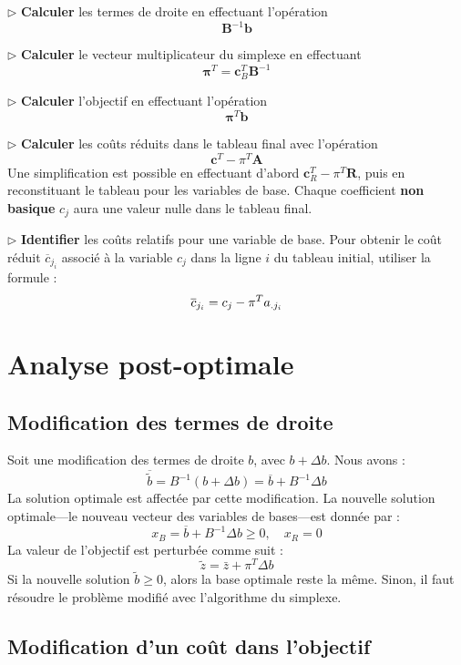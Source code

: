 \documentclass{report}
\begin{document}
\begin{multicols*}{2}
\noindent
$\rhd$
\textbf{Calculer} les termes de droite en effectuant l'opération
\[
\mathbf{B}^{-1} \mathbf{b}
\]

\noindent
$\rhd$
\textbf{Calculer} le vecteur multiplicateur du simplexe en effectuant
\[
\mathbf{\pi}^T = \mathbf{c}_B^T \mathbf{B}^{-1}
\]

\noindent
$\rhd$
\textbf{Calculer} l'objectif en effectuant l'opération 
\[
\mathbf{\pi}^T \mathbf{b}
\]

\noindent
$\rhd$
\textbf{Calculer} les coûts réduits dans le tableau final avec l'opération
\[
\mathbf{c}^T - \pi^T \mathbf{A}
\]
Une simplification est possible en effectuant d'abord 
\( \mathbf{c}_R^T - \pi^T \mathbf{R} \), puis en reconstituant le tableau 
pour les variables de base. Chaque coefficient \textbf{non basique} \( c_j \) aura une valeur nulle dans le tableau final.

\noindent
$\rhd$
\textbf{Identifier} les coûts relatifs pour une variable de base. 
Pour obtenir le coût réduit \( \overline{c}_{j_i} \) associé à la variable 
\( c_j \) dans la ligne \( i \) du tableau initial, utiliser la formule :
\[
\overline{c}_{j_i} = c_j - \pi^T a_{.j_i}
\pagebreak
\] 

\chapter{Analyse post-optimale}




\section{Modification des termes de droite}

Soit une modification des termes de droite \( b \), avec \( b + \Delta b \).
Nous avons :
\[
    \boxed{\overline{\tilde{b}} = B^{-1} (b + \Delta b) = \overline{b} + B^{-1} \Delta b}
\]
La solution optimale est affectée par cette modification. La nouvelle solution
optimale---le nouveau vecteur des variables de bases---est donnée par :
\[
x_B = \overline{b} + B^{-1} \Delta b \geq 0, \quad x_R = 0
\]
La valeur de l'objectif est perturbée comme suit :
\[
\boxed{\tilde{z} = \bar{z} + \pi^T \Delta b}
\]
Si la nouvelle solution \( \tilde{b} \geq 0 \), alors la base optimale reste 
la même. Sinon, il faut résoudre le problème modifié avec l'algorithme du 
simplexe.

\section{Modification d'un coût dans l'objectif}


\end{multicols*}
\end{document}
